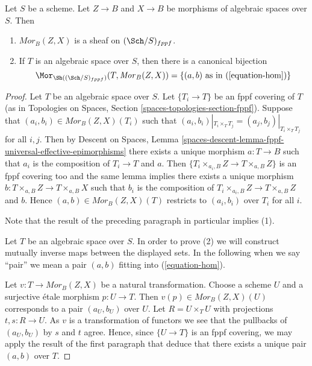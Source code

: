\begin{lemma}
\label{lemma-hom-functor-sheaf}
Let $S$ be a scheme. Let $Z \to B$ and $X \to B$ be morphisms of
algebraic spaces over $S$. Then
\begin{enumerate}
\item $\mathit{Mor}_B(Z, X)$ is a sheaf on
$(\Sch/S)_{fppf}$.
\item If $T$ is an algebraic space over $S$, then there is a
canonical bijection
$$
\Mor_{\Sh((\Sch/S)_{fppf})}(T, \mathit{Mor}_B(Z, X))
=
\{(a, b)\text{ as in }(\ref{equation-hom})\}
$$
\end{enumerate}
\end{lemma}

\begin{proof}
Let $T$ be an algebraic space over $S$. Let $\{T_i \to T\}$ be an fppf
covering of $T$ (as in
Topologies on Spaces, Section \ref{spaces-topologies-section-fppf}).
Suppose that $(a_i, b_i) \in \mathit{Mor}_B(Z, X)(T_i)$ such
that $(a_i, b_i)|_{T_i \times_T T_j} = (a_j, b_j)|_{T_i \times_T T_j}$
for all $i, j$. Then by
Descent on Spaces,
Lemma \ref{spaces-descent-lemma-fppf-universal-effective-epimorphisms}
there exists a unique morphism $a : T \to B$ such that $a_i$ is the
composition of $T_i \to T$ and $a$. Then
$\{T_i \times_{a_i, B} Z \to T \times_{a, B} Z\}$ is an fppf covering
too and the same lemma implies there exists a unique morphism
$b : T \times_{a, B} Z \to T \times_{a, B} X$ such that $b_i$ is the
composition of $T_i \times_{a_i, B} Z \to T \times_{a, B} Z$ and $b$. Hence
$(a, b) \in \mathit{Mor}_B(Z, X)(T)$ restricts to $(a_i, b_i)$
over $T_i$ for all $i$.

\medskip\noindent
Note that the result of the preceding paragraph in particular implies (1).

\medskip\noindent
Let $T$ be an algebraic space over $S$. In order to prove (2) we will
construct mutually inverse maps between the displayed sets. In the
following when we say ``pair'' we mean a pair $(a, b)$ fitting
into (\ref{equation-hom}).

\medskip\noindent
Let $v : T \to \mathit{Mor}_B(Z, X)$ be a natural transformation.
Choose a scheme $U$ and a surjective \'etale morphism $p : U \to T$.
Then $v(p) \in \mathit{Mor}_B(Z, X)(U)$ corresponds to a pair $(a_U, b_U)$
over $U$. Let $R = U \times_T U$ with projections $t, s : R \to U$.
As $v$ is a transformation of functors we see that the pullbacks of
$(a_U, b_U)$ by $s$ and $t$ agree. Hence, since $\{U \to T\}$ is an
fppf covering, we may apply the result of the first paragraph that
deduce that there exists a unique pair $(a, b)$ over $T$.


\end{proof}

